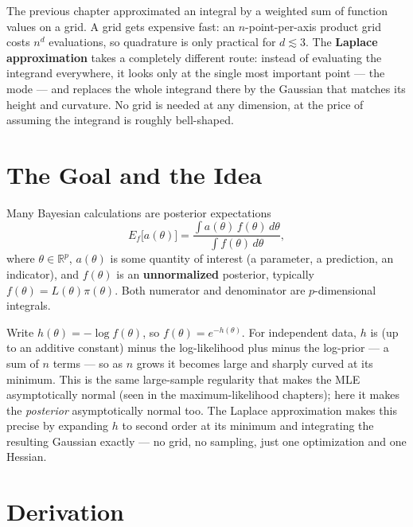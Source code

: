 \documentclass[
  letterpaper,
  DIV=11,
  numbers=noendperiod]{scrreprt}
\begin{document}
The previous chapter approximated an integral by a weighted sum of
function values on a grid. A grid gets expensive fast: an
\(n\)-point-per-axis product grid costs \(n^d\) evaluations, so
quadrature is only practical for \(d \lesssim
3\). The \textbf{Laplace approximation} takes a completely different
route: instead of evaluating the integrand everywhere, it looks only at
the single most important point --- the mode --- and replaces the whole
integrand there by the Gaussian that matches its height and curvature.
No grid is needed at any dimension, at the price of assuming the
integrand is roughly bell-shaped.

\section{The Goal and the Idea}\label{the-goal-and-the-idea}

Many Bayesian calculations are posterior expectations \[
E_f\big[a(\theta)\big] = \frac{\int a(\theta)\,f(\theta)\,d\theta}{\int f(\theta)\,d\theta},
\] where \(\theta \in \mathbb{R}^p\), \(a(\theta)\) is some quantity of
interest (a parameter, a prediction, an indicator), and \(f(\theta)\) is
an \textbf{unnormalized} posterior, typically
\(f(\theta) = L(\theta)\pi(\theta)\). Both numerator and denominator are
\(p\)-dimensional integrals.

Write \(h(\theta) = -\log f(\theta)\), so
\(f(\theta) = e^{-h(\theta)}\). For independent data, \(h\) is (up to an
additive constant) minus the log-likelihood plus minus the log-prior ---
a sum of \(n\) terms --- so as \(n\) grows it becomes large and sharply
curved at its minimum. This is the same large-sample regularity that
makes the MLE asymptotically normal (seen in the maximum-likelihood
chapters); here it makes the \emph{posterior} asymptotically normal too.
The Laplace approximation makes this precise by expanding \(h\) to
second order at its minimum and integrating the resulting Gaussian
exactly --- no grid, no sampling, just one optimization and one Hessian.

\section{Derivation}\label{derivation-1}
\end{document}
